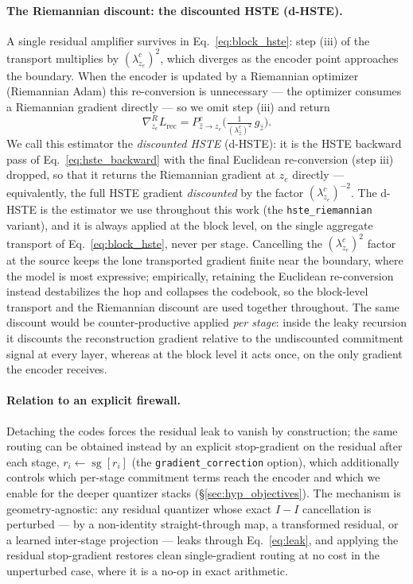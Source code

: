 \documentclass[12pt]{report}
\begin{document}
\paragraph{The Riemannian discount: the discounted HSTE (d-HSTE).}
A single residual amplifier survives in Eq.~\ref{eq:block_hste}: step (iii) of the transport multiplies by $(\lambda^c_{z_e})^2$, which diverges as the encoder point approaches the boundary. When the encoder is updated by a Riemannian optimizer (Riemannian Adam) this re-conversion is unnecessary --- the optimizer consumes a Riemannian gradient directly --- so we omit step (iii) and return
\begin{equation}
    \label{eq:hste_riemannian}
    \nabla^R_{z_e} L_{\text{rec}} = P^c_{\hat z\to z_e}\!\Big(\tfrac{1}{(\lambda^c_{\hat z})^2}\,g_{\hat z}\Big).
\end{equation}
We call this estimator the \emph{discounted HSTE} (d-HSTE): it is the HSTE backward pass of Eq.~\ref{eq:hste_backward} with the final Euclidean re-conversion (step iii) dropped, so that it returns the Riemannian gradient at $z_e$ directly --- equivalently, the full HSTE gradient \emph{discounted} by the factor $(\lambda^c_{z_e})^{-2}$. The d-HSTE is the estimator we use throughout this work (the \texttt{hste\_riemannian} variant), and it is always applied at the block level, on the single aggregate transport of Eq.~\ref{eq:block_hste}, never per stage. Cancelling the $(\lambda^c_{z_e})^2$ factor at the source keeps the lone transported gradient finite near the boundary, where the model is most expressive; empirically, retaining the Euclidean re-conversion instead destabilizes the hop and collapses the codebook, so the block-level transport and the Riemannian discount are used together throughout. The same discount would be counter-productive applied \emph{per stage}: inside the leaky recursion it discounts the reconstruction gradient relative to the undiscounted commitment signal at every layer, whereas at the block level it acts once, on the only gradient the encoder receives.

\paragraph{Relation to an explicit firewall.}
Detaching the codes forces the residual leak to vanish by construction; the same routing can be obtained instead by an explicit stop-gradient on the residual after each stage, $r_i\leftarrow\operatorname{sg}[r_i]$ (the \texttt{gradient\_correction} option), which additionally controls which per-stage commitment terms reach the encoder and which we enable for the deeper quantizer stacks (\S\ref{sec:hyp_objectives}). The mechanism is geometry-agnostic: any residual quantizer whose exact $I-I$ cancellation is perturbed --- by a non-identity straight-through map, a transformed residual, or a learned inter-stage projection --- leaks through Eq.~\ref{eq:leak}, and applying the residual stop-gradient restores clean single-gradient routing at no cost in the unperturbed case, where it is a no-op in exact arithmetic.
\end{document}
